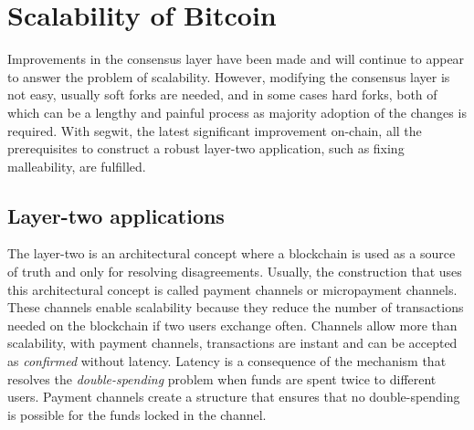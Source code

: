\section{Scalability of Bitcoin}

Improvements in the consensus layer have been made and will continue to appear
to answer the problem of scalability. However, modifying the consensus layer is
not easy, usually soft forks are needed, and in some cases hard forks, both of which
can be a lengthy and painful process as majority adoption of the changes is required. With
\gls{segwit}, the latest significant improvement on-chain, all the prerequisites
to construct a robust layer-two application, such as fixing malleability, are
fulfilled.

\subsection{Layer-two applications}

The layer-two is an architectural concept where a blockchain is used as a source
of truth and only for resolving disagreements. Usually, the construction that
uses this architectural concept is called payment channels or micropayment
channels. These channels enable scalability because they reduce the number of
transactions needed on the blockchain if two users exchange often.
Channels allow more than scalability, with payment channels, transactions are
instant and can be accepted as \textit{confirmed} without latency. Latency is a
consequence of the mechanism that resolves the \textit{double-spending} problem
when funds are spent twice to different users. Payment channels create a
structure that ensures that no double-spending is possible for the funds locked
in the channel.
